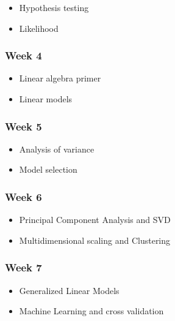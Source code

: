 \documentclass[
  letterpaper,
  DIV=11,
  numbers=noendperiod]{scrreprt}
\providecommand{\tightlist}{%
  \setlength{\itemsep}{0pt}\setlength{\parskip}{0pt}}\usepackage{longtable,booktabs,array}
\begin{document}
\begin{itemize}
\tightlist
\item
  Hypothesis testing
\item
  Likelihood
\end{itemize}

\subsubsection*{Week 4}\label{week-4}

\begin{itemize}
\tightlist
\item
  Linear algebra primer
\item
  Linear models
\end{itemize}

\subsubsection*{Week 5}\label{week-5}

\begin{itemize}
\tightlist
\item
  Analysis of variance
\item
  Model selection
\end{itemize}

\subsubsection*{Week 6}\label{week-6}

\begin{itemize}
\tightlist
\item
  Principal Component Analysis and SVD
\item
  Multidimensional scaling and Clustering
\end{itemize}

\subsubsection*{Week 7}\label{week-7}

\begin{itemize}
\tightlist
\item
  Generalized Linear Models
\item
  Machine Learning and cross validation
\end{itemize}
\end{document}
